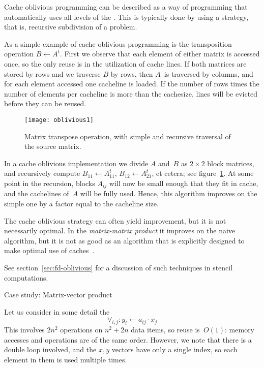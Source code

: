 Cache oblivious programming can be described as a way of programming
that automatically uses all levels of the
. This is typically done by using a
 strategy, that is, recursive
subdivision of a problem.

As a simple example of cache oblivious programming is the 
{transposition} operation $B\leftarrow A^t$. First we observe that each
element of either matrix is accessed once, so the only reuse is in the
utilization of cache lines. If both matrices are stored by
rows and we traverse $B$ by rows, then $A$~is traversed by columns,
and for each element accessed one cacheline is loaded. If the number
of rows times the number of elements per cacheline is more than the
cachesize, lines will be evicted before they can be reused.

\begin{figure}[ht]
  \texttt{[image: oblivious1]}
  \caption{Matrix transpose operation, with simple and recursive
    traversal of the source matrix.}
  \label{fig:oblivious-transpose}
\end{figure}
In a cache oblivious implementation we divide $A$ and~$B$ as
$2\times2$ block matrices, and recursively compute $B_{11}\leftarrow
A_{11}^t$, $B_{12}\leftarrow A_{21}^t$, et cetera; see
figure~\ref{fig:oblivious-transpose}. At some point in the recursion,
blocks $A_{ij}$ will now be small enough that they fit in cache, and
the cachelines of~$A$ will be fully used. Hence, this algorithm
improves on the simple one by a factor equal to the cacheline size.

The cache oblivious strategy can often yield improvement, but it is
not necessarily optimal. In the
%
\emph{matrix-matrix product}
it improves on
the naive algorithm, but it is not as good as an algorithm that is
explicitly designed to make optimal use of
caches~\cite{GotoGeijn:2008:Anatomy}.

See section~\ref{sec:fd-oblivious} for a discussion of such techniques
in stencil computations.


 {Case study: Matrix-vector product}
\label{sec:mvp-opt}

Let us consider in some detail
the 
\[ \forall_{i,j}\colon y_i\leftarrow a_{ij}\cdot x_j \] This involves $2n^2$
operations on $n^2+2n$ data items, so reuse is~$O(1)$: memory accesses
and operations are of the same order. However, we note that there is a
double loop involved, and the $x,y$ vectors have only a single index,
so each element in them is used multiple times.

